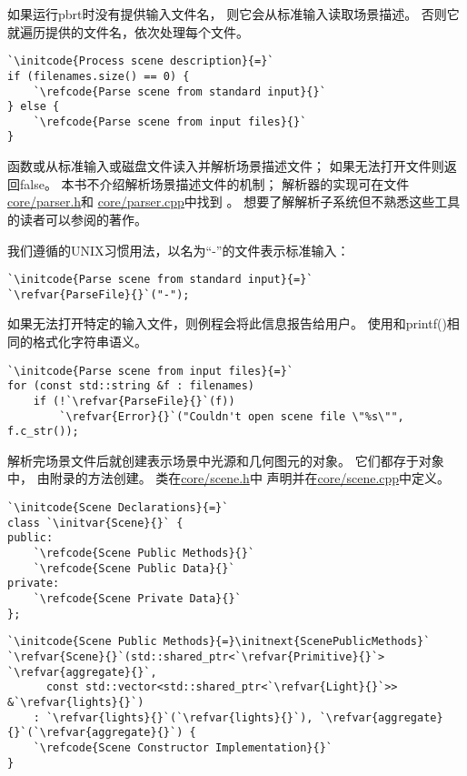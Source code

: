 如果运行pbrt时没有提供输入文件名，
则它会从标准输入读取场景描述。
否则它就遍历提供的文件名，依次处理每个文件。
\begin{lstlisting}
`\initcode{Process scene description}{=}`
if (filenames.size() == 0) {
    `\refcode{Parse scene from standard input}{}`
} else {
    `\refcode{Parse scene from input files}{}`
}
\end{lstlisting}
函数{}或从标准输入或磁盘文件读入并解析场景描述文件；
如果无法打开文件则返回{\ttfamily false}。
本书不介绍解析场景描述文件的机制；
解析器的实现可在文件\href{https://github.com/mmp/pbrt-v3/blob/master/src/core/parser.h}{\ttfamily core/parser.h}和
\href{https://github.com/mmp/pbrt-v3/blob/master/src/core/parser.cpp}{\ttfamily core/parser.cpp}中找到
。
想要了解解析子系统但不熟悉这些工具的读者可以参阅\citet{10.5555/136311}的著作。

我们遵循的UNIX习惯用法，以名为“{\ttfamily -}”的文件表示标准输入：
\begin{lstlisting}
`\initcode{Parse scene from standard input}{=}`
`\refvar{ParseFile}{}`("-");
\end{lstlisting}

如果无法打开特定的输入文件，则例程会将此信息报告给用户。
使用和{\ttfamily printf()}相同的格式化字符串语义。
\begin{lstlisting}
`\initcode{Parse scene from input files}{=}`
for (const std::string &f : filenames)
    if (!`\refvar{ParseFile}{}`(f))
        `\refvar{Error}{}`("Couldn't open scene file \"%s\"", f.c_str());
\end{lstlisting}

解析完场景文件后就创建表示场景中光源和几何图元的对象。
它们都存于对象中，
由附录的方法创建。
类在\href{https://github.com/mmp/pbrt-v3/tree/master/src/core/scene.h}{\ttfamily core/scene.h}中
声明并在\href{https://github.com/mmp/pbrt-v3/tree/master/src/core/scene.cpp}{\ttfamily core/scene.cpp}中定义。
\begin{lstlisting}
`\initcode{Scene Declarations}{=}`
class `\initvar{Scene}{}` {
public:
    `\refcode{Scene Public Methods}{}`
    `\refcode{Scene Public Data}{}`
private:
    `\refcode{Scene Private Data}{}`
};
\end{lstlisting}

\begin{lstlisting}
`\initcode{Scene Public Methods}{=}\initnext{ScenePublicMethods}`
`\refvar{Scene}{}`(std::shared_ptr<`\refvar{Primitive}{}`> `\refvar{aggregate}{}`,
      const std::vector<std::shared_ptr<`\refvar{Light}{}`>> &`\refvar{lights}{}`)
    : `\refvar{lights}{}`(`\refvar{lights}{}`), `\refvar{aggregate}{}`(`\refvar{aggregate}{}`) {
    `\refcode{Scene Constructor Implementation}{}`
}
\end{lstlisting}

